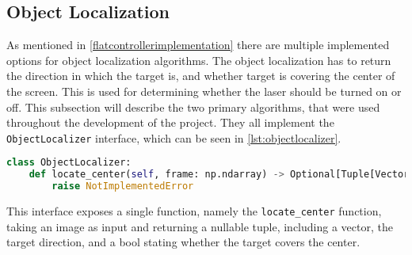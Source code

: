 \subsection{Object Localization}\label{solution:ObjectLocalization}
As mentioned in \autoref{flatcontrollerimplementation} there are multiple implemented options for object localization algorithms.
The object localization has to return the direction in which the target is, and whether target is covering the center of the screen.
This is used for determining whether the laser should be turned on or off.
This subsection will describe the two primary algorithms, that were used throughout the development of the project.
They all implement the \texttt{ObjectLocalizer} interface, which can be seen in \autoref{lst:objectlocalizer}.

\begin{lstlisting}[language=Python,label={lst:objectlocalizer},caption={The interface of all object localization algorithms}] 
class ObjectLocalizer:
	def locate_center(self, frame: np.ndarray) -> Optional[Tuple[Vector, bool]]:
		raise NotImplementedError
\end{lstlisting}
This interface exposes a single function, namely the \texttt{locate\_center} function, taking an image as input and returning a nullable tuple, including a vector, the target direction, and a bool stating whether the target covers the center.


